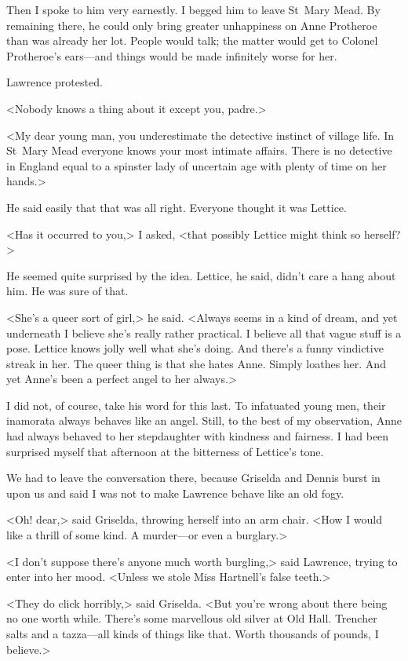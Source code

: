 Then I spoke to him very earnestly. I begged him to leave St~Mary Mead. By remaining there, he could only bring greater unhappiness on Anne Protheroe than was already her lot. People would talk; the matter would get to Colonel Protheroe's ears—and things would be made infinitely worse for her.

Lawrence protested.

<Nobody knows a thing about it except you, padre.>

<My dear young man, you underestimate the detective instinct of village life. In St~Mary Mead everyone knows your most intimate affairs. There is no detective in England equal to a spinster lady of uncertain age with plenty of time on her hands.>

He said easily that that was all right. Everyone thought it was Lettice.

<Has it occurred to you,> I asked, <that possibly Lettice might think so herself?>

He seemed quite surprised by the idea. Lettice, he said, didn't care a hang about him. He was sure of that.

<She's a queer sort of girl,> he said. <Always seems in a kind of dream, and yet underneath I believe she's really rather practical. I believe all that vague stuff is a pose. Lettice knows jolly well what she's doing. And there's a funny vindictive streak in her. The queer thing is that she hates Anne. Simply loathes her. And yet Anne's been a perfect angel to her always.>

I did not, of course, take his word for this last. To infatuated young men, their inamorata always behaves like an angel. Still, to the best of my observation, Anne had always behaved to her stepdaughter with kindness and fairness. I had been surprised myself that afternoon at the bitterness of Lettice's tone.

We had to leave the conversation there, because Griselda and Dennis burst in upon us and said I was not to make Lawrence behave like an old fogy.

<Oh! dear,> said Griselda, throwing herself into an arm chair. <How I would like a thrill of some kind. A murder—or even a burglary.>

<I don't suppose there's anyone much worth burgling,> said Lawrence, trying to enter into her mood. <Unless we stole Miss Hartnell's false teeth.>

<They do click horribly,> said Griselda. <But you're wrong about there being no one worth while. There's some marvellous old silver at Old Hall. Trencher salts and a  tazza—all kinds of things like that. Worth thousands of pounds, I believe.>

